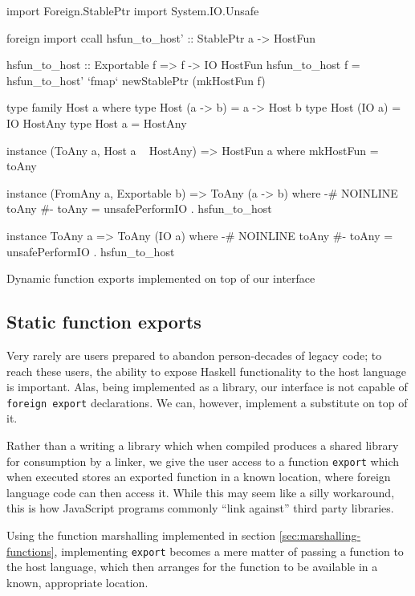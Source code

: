 \documentclass{sigplanconf}
\begin{document}
\begin{listingfloat}
\begin{code}
  import Foreign.StablePtr
  import System.IO.Unsafe

  foreign import ccall
    hsfun_to_host' :: StablePtr a -> HostFun

  hsfun_to_host :: Exportable f => f -> IO HostFun
  hsfun_to_host f =
    hsfun_to_host' `fmap` newStablePtr (mkHostFun f)

  type family Host a where
    type Host (a -> b) = a -> Host b
    type Host (IO a)   = IO HostAny
    type Host a        = HostAny

  instance (ToAny a, Host a ~ HostAny) =>
            HostFun a where
    mkHostFun = toAny

  instance (FromAny a, Exportable b) =>
            ToAny (a -> b) where
    {-# NOINLINE toAny #-}
    toAny = unsafePerformIO . hsfun_to_host

  instance ToAny a => ToAny (IO a) where
    {-# NOINLINE toAny #-}
    toAny = unsafePerformIO . hsfun_to_host
\end{code}
\caption{Dynamic function exports implemented on top of our interface}
\label{lst:export-final}
\end{listingfloat}

\subsection{Static function exports}
\label{sec:exports}
Very rarely are users prepared to abandon person-decades of legacy code;
to reach these users, the ability to expose Haskell functionality to the host
language is important. Alas, being implemented as a library, our interface is
not capable of \lstinline!foreign export! declarations. We can, however,
implement a substitute on top of it.

Rather than a writing a library which when compiled produces a shared library
for consumption by a linker, we give the user access to a function
\lstinline!export! which when executed stores an exported function in a
known location, where foreign language code can then access it.
While this may seem like a silly workaround, this is how JavaScript programs
commonly ``link against'' third party libraries.

Using the function marshalling implemented in section
\ref{sec:marshalling-functions}, implementing \lstinline!export! becomes a
mere matter of passing a function to the host language, which then
arranges for the function to be available in a known, appropriate location.
\end{document}
